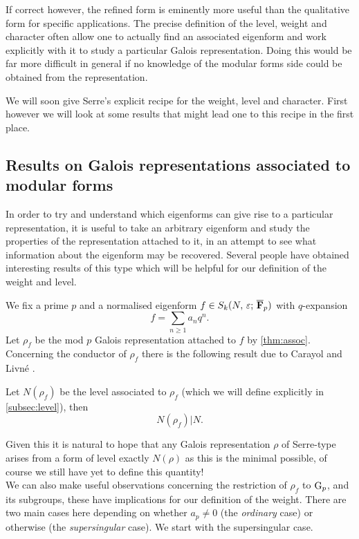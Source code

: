 \documentclass[a4paper,12pt]{article}
\begin{document}
If correct however, the refined form is eminently more useful than the qualitative form for specific applications.
The precise definition of the level, weight and character often allow one to actually find an associated eigenform and work explicitly with it to study a particular Galois representation.
Doing this would be far more difficult in general if no knowledge of the modular forms side could be obtained from the representation.

We will soon give Serre's explicit recipe for the weight, level and character.
First however we will look at some results that might lead one to this recipe in the first place.

\subsection{Results on Galois representations associated to modular forms}\label{sec:galassoc}
In order to try and understand which eigenforms can give rise to a particular representation, it is useful to take an arbitrary eigenform and study the properties of the representation attached to it, in an attempt to see what information about the eigenform may be recovered.
Several people have obtained interesting results of this type which will be helpful for our definition of the weight and level.

We fix a prime $p$ and a normalised eigenform $f \in S_k(N,\,\varepsilon;\,\overline{\mathbf{F}}_p)$ with $q$-expansion
\[
f = \sum_{n\ge 1} a_nq^n.
\]
Let $\rho_f$ be the mod $p$ Galois representation attached to $f$ by \cref{thm:assoc}.
Concerning the conductor of $\rho_f$ there is the following result due to Carayol and Livn\'e \cite{Carayol, Livne}.

\begin{thm}\label{thm:level}
Let $N(\rho_f)$ be the level associated to $\rho_f$ (which we will define explicitly in \cref{subsec:level}), then
\[
N(\rho_f)|N.
\]
\end{thm}

Given this it is natural to hope that any Galois representation $\rho$ of Serre-type arises from a form of level exactly $N(\rho)$ as this is the minimal possible, of course we still have yet to define this quantity!
\\[12pt] \noindent
We can also make useful observations concerning the restriction of $\rho_f$ to $\mathrm{G}_p$, and its subgroups, these have implications for our definition of the weight.
There are two main cases here depending on whether $a_p \ne 0$ (the \emph{ordinary} case) or otherwise (the \emph{supersingular} case).
We start with the supersingular case.
\end{document}
